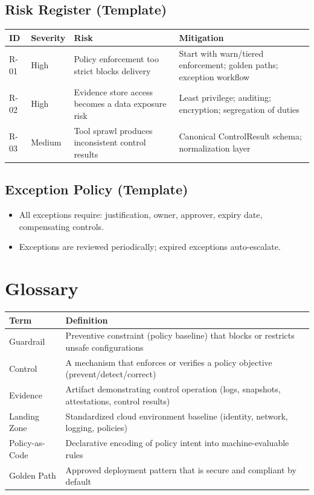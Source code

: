 \documentclass[11pt]{report}
\begin{document}
\subsection{Risk Register (Template)}
\begin{tabularx}{\textwidth}{@{}l l >{\raggedright\arraybackslash}X >{\raggedright\arraybackslash}X@{}}
\toprule
\textbf{ID} & \textbf{Severity} & \textbf{Risk} & \textbf{Mitigation} \\
\midrule
R-01 & High & Policy enforcement too strict blocks delivery & Start with warn/tiered enforcement; golden paths; exception workflow \\
R-02 & High & Evidence store access becomes a data exposure risk & Least privilege; auditing; encryption; segregation of duties \\
R-03 & Medium & Tool sprawl produces inconsistent control results & Canonical ControlResult schema; normalization layer \\
\bottomrule
\end{tabularx}

\subsection{Exception Policy (Template)}
\begin{itemize}
  \item All exceptions require: justification, owner, approver, expiry date, compensating controls.
  \item Exceptions are reviewed periodically; expired exceptions auto-escalate.
\end{itemize}

\section{Glossary}
\begin{tabularx}{\textwidth}{@{}l >{\raggedright\arraybackslash}X@{}}
\toprule
\textbf{Term} & \textbf{Definition} \\
\midrule
Guardrail & Preventive constraint (policy baseline) that blocks or restricts unsafe configurations \\
Control & A mechanism that enforces or verifies a policy objective (prevent/detect/correct) \\
Evidence & Artifact demonstrating control operation (logs, snapshots, attestations, control results) \\
Landing Zone & Standardized cloud environment baseline (identity, network, logging, policies) \\
Policy-as-Code & Declarative encoding of policy intent into machine-evaluable rules \\
Golden Path & Approved deployment pattern that is secure and compliant by default \\
\bottomrule
\end{tabularx}
\end{document}
